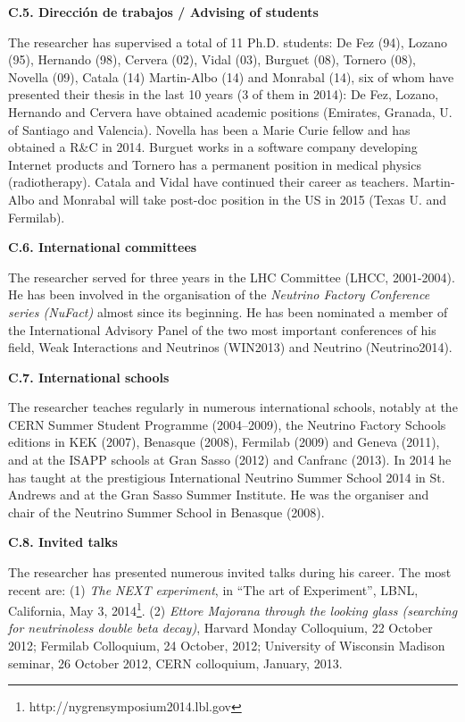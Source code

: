 \documentclass[a4paper,11pt,oneside]{article}
\begin{document}
\vspace{6pt}

\noindent\textbf{C.5. Dirección de trabajos / Advising of students}

The researcher has supervised a total of 11 Ph.D. students: De Fez (94), Lozano (95), Hernando (98), Cervera (02), Vidal (03), Burguet (08), Tornero (08), Novella (09), Catala (14) Martin-Albo (14) and Monrabal (14), six of whom have presented their thesis in the last 10 years (3 of them in 2014): De Fez, Lozano, Hernando and Cervera have obtained academic positions (Emirates, Granada, U. of Santiago and Valencia). Novella has been a Marie Curie fellow and has obtained a R\&C in 2014. Burguet works in a software company developing Internet products and Tornero has a permanent position in medical physics (radiotherapy). Catala and Vidal have continued their career as teachers. Martin-Albo and Monrabal will take post-doc position in the US in 2015 (Texas U. and Fermilab). 

\vspace{6pt}

\noindent\textbf{C.6. International committees}

The researcher served for three years in the LHC Committee (LHCC, 2001-2004). He has been involved in the organisation of the \textit{Neutrino Factory Conference series (NuFact)} almost since its beginning. He has been nominated a member of the International Advisory Panel of the two most important conferences of his field, Weak Interactions and Neutrinos (WIN2013) and Neutrino (Neutrino2014). 

\vspace{6pt}

\noindent\textbf{C.7. International schools}

The researcher teaches regularly in numerous international schools, notably at the CERN Summer Student Programme (2004--2009), the 
Neutrino Factory Schools editions in KEK (2007), Benasque (2008), Fermilab (2009) and Geneva (2011), and at the ISAPP schools at
Gran Sasso (2012) and Canfranc (2013). In 2014 he has taught at the prestigious International Neutrino Summer School 2014 in St. Andrews and at the Gran Sasso Summer Institute. He was the organiser and chair of the Neutrino Summer School in Benasque (2008).

\vspace{6pt}

\noindent\textbf{C.8. Invited talks}

The researcher has presented numerous invited talks during his career. The most recent are: 
(1) {\em The NEXT experiment}, in ``The art of Experiment'', LBNL, California, May 3, 2014\footnote{http://nygrensymposium2014.lbl.gov}. 
(2) \textit{Ettore Majorana through the looking glass (searching for neutrinoless double beta decay)}, Harvard Monday Colloquium, 22 October 2012; Fermilab Colloquium, 24 October, 2012; University of Wisconsin Madison seminar, 26 October 2012, CERN colloquium, January, 2013.
\end{document}
